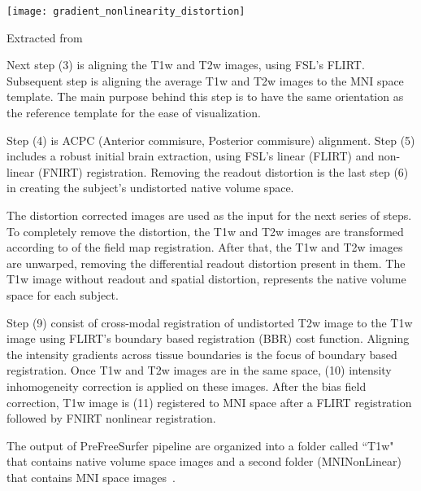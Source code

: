 \begin{center}
  \texttt{[image: gradient\_nonlinearity\_distortion]}
  \label{fig:gradient_nonlinearity}
  \caption*{Extracted from \cite{Gla13}}
\end{center}

Next step (3) is aligning the T1w and T2w images, using FSL's FLIRT. Subsequent step is aligning the average T1w and T2w images to the MNI space template. The main purpose behind this step is to have the same orientation as the reference template for the ease of visualization.

Step (4) is ACPC (Anterior commisure, Posterior commisure) alignment. Step (5) includes a robust initial brain extraction, using FSL's linear (FLIRT) and non-linear (FNIRT) registration. Removing the readout distortion is the last step (6) in creating the subject's undistorted native volume space. %

The distortion corrected images are used as the input for the next series of steps. To completely remove the distortion, the T1w and T2w images are transformed according to of the field map registration. After that, the T1w and T2w images are unwarped, removing the differential readout distortion present in them. The T1w image without readout and spatial distortion, represents the native volume space for each subject.

Step (9) consist of cross-modal registration of undistorted T2w image to the T1w image using FLIRT's boundary based registration (BBR) cost function. Aligning the intensity gradients across tissue boundaries is the focus of boundary based registration. Once T1w and T2w images are in the same space, (10) intensity inhomogeneity correction is applied on these images. After the bias field correction, T1w image is (11) registered to MNI space after a FLIRT registration followed by FNIRT nonlinear registration.

The output of PreFreeSurfer pipeline are organized into a folder called ``T1w" that contains native volume space images and a second folder (MNINonLinear) that contains MNI space images~\cite{Gla13}.

